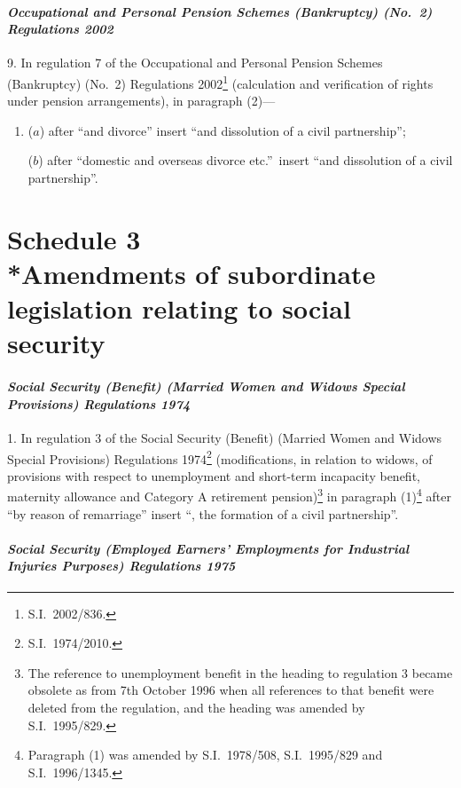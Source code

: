 \documentclass[12pt,a4paper]{article}
\begin{document}
\subsection*{\itshape Occupational and Personal Pension Schemes (Bankruptcy) (No.\ 2) Regulations 2002}

9.  In regulation 7 of the Occupational and Personal Pension Schemes (Bankruptcy) (No.\ 2) Regulations 2002\footnote{S.I.\ 2002/836.} (calculation and verification of rights under pension arrangements), in paragraph (2)—
\begin{enumerate}\item[]
($a$) after “and divorce” insert “and dissolution of a civil partnership”;

($b$) after “domestic and overseas divorce etc.”\ insert “and dissolution of a civil partnership”.
\end{enumerate}

\part[Schedule 3 --- Amendments of subordinate legislation relating to social security]{Schedule 3\\*Amendments of subordinate legislation relating to social security}

\renewcommand\parthead{--- Schedule 3}

\subsection*{\itshape Social Security (Benefit) (Married Women and Widows Special Provisions) Regulations 1974}

1.  In regulation 3 of the Social Security (Benefit) (Married Women and Widows Special Provisions) Regulations 1974\footnote{S.I.\ 1974/2010.} (modifications, in relation to widows, of provisions with respect to unemployment and short-term incapacity benefit, maternity allowance and Category A retirement pension)\footnote{The reference to unemployment benefit in the heading to regulation 3 became obsolete as from 7th October 1996 when all references to that benefit were deleted from the regulation, and the heading was amended by S.I.\ 1995/829.} in paragraph (1)\footnote{Paragraph (1) was amended by S.I.\ 1978/508, S.I.\ 1995/829 and S.I.\ 1996/1345.} after “by reason of remarriage” insert “, the formation of a civil partnership”.

\subsection*{\itshape Social Security (Employed Earners' Employments for Industrial Injuries Purposes) Regulations 1975}
\end{document}
